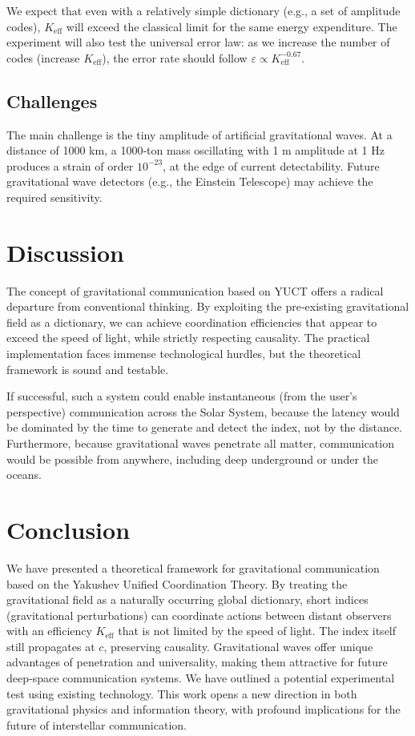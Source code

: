 \documentclass[12pt,a4paper]{article}
\newcommand{\Keff}{K_{\mathrm{eff}}}
\newcommand{\eps}{\varepsilon}
\begin{document}
	We expect that even with a relatively simple dictionary (e.g., a set of amplitude codes), \(\Keff\) will exceed the classical limit for the same energy expenditure. The experiment will also test the universal error law: as we increase the number of codes (increase \(\Keff\)), the error rate should follow \(\eps \propto \Keff^{-0.67}\).
	
	\subsection{Challenges}
	
	The main challenge is the tiny amplitude of artificial gravitational waves. At a distance of 1000 km, a 1000‑ton mass oscillating with 1 m amplitude at 1 Hz produces a strain of order \(10^{-23}\), at the edge of current detectability. Future gravitational wave detectors (e.g., the Einstein Telescope) may achieve the required sensitivity.
	
	\section{Discussion}
	\label{sec:discussion}
	
	The concept of gravitational communication based on YUCT offers a radical departure from conventional thinking. By exploiting the pre‑existing gravitational field as a dictionary, we can achieve coordination efficiencies that appear to exceed the speed of light, while strictly respecting causality. The practical implementation faces immense technological hurdles, but the theoretical framework is sound and testable.
	
	If successful, such a system could enable instantaneous (from the user’s perspective) communication across the Solar System, because the latency would be dominated by the time to generate and detect the index, not by the distance. Furthermore, because gravitational waves penetrate all matter, communication would be possible from anywhere, including deep underground or under the oceans.
	
	\section{Conclusion}
	\label{sec:conclusion}
	
	We have presented a theoretical framework for gravitational communication based on the Yakushev Unified Coordination Theory. By treating the gravitational field as a naturally occurring global dictionary, short indices (gravitational perturbations) can coordinate actions between distant observers with an efficiency \(\Keff\) that is not limited by the speed of light. The index itself still propagates at \(c\), preserving causality. Gravitational waves offer unique advantages of penetration and universality, making them attractive for future deep‑space communication systems. We have outlined a potential experimental test using existing technology. This work opens a new direction in both gravitational physics and information theory, with profound implications for the future of interstellar communication.
	
\end{document}
